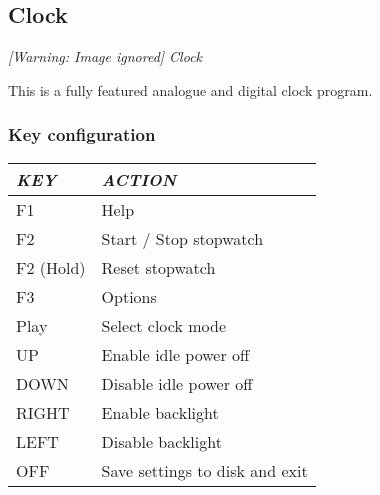 \subsection{Clock}
{\centering\itshape
  [Warning: Image ignored] %
 \newline
Clock
\par}

This is a fully featured analogue and digital clock program.  

\subsubsection{Key configuration}

\begin{center}\begin{tabular}{|p{2.411cm}|p{6.012cm}|}
\hline
{\centering\bfseries\itshape
KEY
\par}
&
{\centering\bfseries\itshape
ACTION
\par}
\\\hline
{\centering
F1
\par}
&
Help
\\\hline
{\centering
F2
\par}
&
Start / Stop stopwatch
\\\hline
{\centering
F2 (Hold)
\par}
&
Reset stopwatch
\\\hline
{\centering
F3
\par}
&
Options
\\\hline
{\centering
Play
\par}
&
Select clock mode
\\\hline
{\centering
UP
\par}
&
Enable idle power off
\\\hline
{\centering
DOWN
\par}
&
Disable idle power off
\\\hline
{\centering
RIGHT
\par}
&
Enable backlight
\\\hline
{\centering
LEFT
\par}
&
Disable backlight
\\\hline
{\centering
OFF
\par}
&
Save settings to disk and exit
\\\hline
\end{tabular}\end{center}


